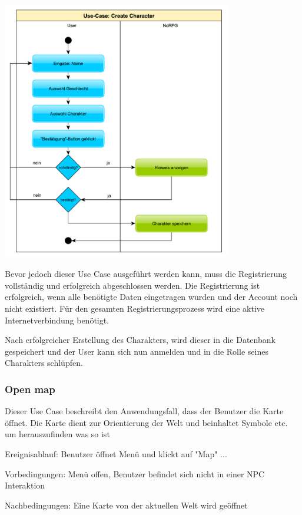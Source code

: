 			\begin{center}
				\includegraphics[width=10cm]{pics/CreateCharacter.pdf}
			\end{center}
	
			Bevor jedoch dieser Use Case ausgeführt werden kann, muss die Registrierung vollständig und erfolgreich abgeschlossen werden. Die Registrierung ist erfolgreich, wenn alle benötigte Daten eingetragen wurden und der Account noch nicht existiert. Für den gesamten Registrierungsprozess wird eine aktive Internetverbindung benötigt.
			
			Nach erfolgreicher Erstellung des Charakters, wird dieser in die Datenbank gespeichert und der User kann sich nun anmelden und in die Rolle seines Charakters schlüpfen.
			
		\subsubsection{Open map}
			Dieser Use Case beschreibt den Anwendungsfall, dass der Benutzer die Karte öffnet. Die Karte dient zur Orientierung der Welt und beinhaltet Symbole etc. um herauszufinden was so ist
			
			Ereignisablauf:	Benutzer öffnet Menü und klickt auf "Map" ...
	
			Vorbedingungen: Menü offen, Benutzer befindet sich nicht in einer NPC Interaktion
			
			Nachbedingungen: Eine Karte von der aktuellen Welt wird geöffnet
	
